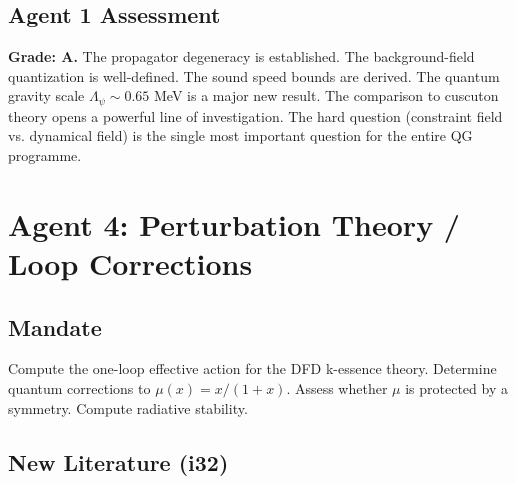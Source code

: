 \documentclass[11pt,a4paper]{article}
\begin{document}
\subsection{Agent 1 Assessment}

\textbf{Grade: A.} The propagator degeneracy is established. The background-field quantization is well-defined. The sound speed bounds are derived. The quantum gravity scale $\Lambda_\psi \sim 0.65$ MeV is a major new result. The comparison to cuscuton theory opens a powerful line of investigation. The hard question (constraint field vs. dynamical field) is the single most important question for the entire QG programme.


\newpage
\section{Agent 4: Perturbation Theory / Loop Corrections}
\label{sec:agent4}

\subsection{Mandate}

Compute the one-loop effective action for the DFD k-essence theory. Determine quantum corrections to $\mu(x) = x/(1+x)$. Assess whether $\mu$ is protected by a symmetry. Compute radiative stability.

\subsection{New Literature (i32)}
\end{document}
